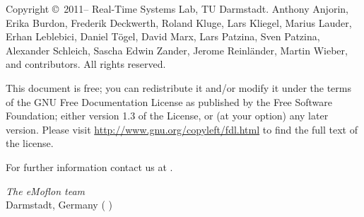 \begin{small} 
Copyright \copyright~2011--\the\year{} Real-Time Systems Lab, TU Darmstadt.
Anthony Anjorin, Erika Burdon, Frederik Deckwerth, Roland Kluge, Lars Kliegel, Marius Lauder,
Erhan Leblebici, Daniel T\"ogel, David Marx, Lars Patzina, Sven Patzina, Alexander Schleich, Sascha Edwin Zander, Jerome Reinl\"ander, Martin Wieber, and contributors.
All rights reserved.

This document is free; you can redistribute it and/or modify it under the terms of the GNU Free Documentation License as published by the Free Software Foundation; either version 1.3 of the License, or (at your option) any later version.
Please visit \href{http://www.gnu.org/copyleft/fdl.html}{http://www.gnu.org/copyleft/fdl.html} to find the full text of the license.
 
For further information contact us at \eMoflonContact.
  
\vskip3cm
\textit{The eMoflon team}\\
Darmstadt, Germany (\monthword{\month} \the\year)
\end{small}